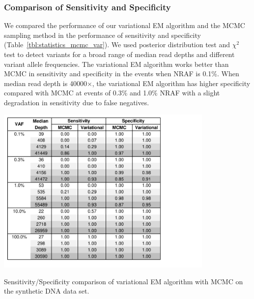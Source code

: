 \documentclass[11pt,reqno]{amsart}
\begin{document}
\subsubsection{Comparison of Sensitivity and Specificity}
We compared the performance of our variational EM algorithm and the MCMC sampling method in the performance of sensitivity and specificity (Table~\ref{tbl:statistics_mcmc_var}).
We used posterior distribution test and $\chi^2$ test to detect variants for a broad range of median read depths and different variant allele frequencies.
The variational EM algorithm works better than MCMC in sensitivity and specificity in the events when NRAF is 0.1\%.
When median read depth is 40000$\times$, the variational EM algorithm has higher specificity compared with MCMC at events of 0.3\% and 1.0\% NRAF with a slight degradation in sensitivity due to false negatives.
\begin{table}[ht]
\centering
\includegraphics[width=0.8\textwidth]{tables/statistics_mcmc_var.pdf}
\caption{Sensitivity/Specificity comparison of variational EM algorithm with MCMC on the synthetic DNA data set.}
\label{tbl:statistics_mcmc_var}
\end{table}
\end{document}
